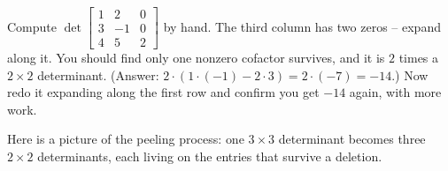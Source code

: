 \begin{labbox}
Compute $\det\!\begin{bmatrix} 1 & 2 & 0 \\ 3 & -1 & 0 \\ 4 & 5 & 2 \end{bmatrix}$ by hand. The third
column has two zeros -- expand along it. You should find only one nonzero cofactor survives, and it is
$2$ times a $2\times2$ determinant. (Answer: $2\cdot(1\cdot(-1)-2\cdot3)=2\cdot(-7)=-14$.) Now redo
it expanding along the first row and confirm you get $-14$ again, with more work.
\end{labbox}

Here is a picture of the peeling process: one $3\times3$ determinant becomes three $2\times2$
determinants, each living on the entries that survive a deletion.

